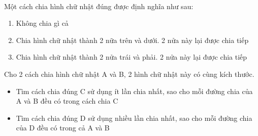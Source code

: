  

Một cách chia hình chữ nhật đúng được định nghĩa như sau:
\begin{enumerate}
	\item Không chia gì cả
	\item Chia hình chữ nhật thành 2 nữa trên và dưới. 2 nửa này lại được chia tiếp
	\item Chia hình chữ nhật thành 2 nửa trái và phải. 2 nửa này lại được chia tiếp
\end{enumerate}

Cho 2 cách chia hình chữ nhật A và B, 2 hình chữ nhật này có cùng kích thước.
\begin{itemize}
	\item Tìm cách chia đúng C sử dụng ít lần chia nhất, sao cho mỗi đường chia của A và B đều có trong cách chia C
	\item Tìm cách chia đúng D sử dụng nhiều lần chia nhất, sao cho mỗi đường chia của D đều có trong cả A và B
\end{itemize}